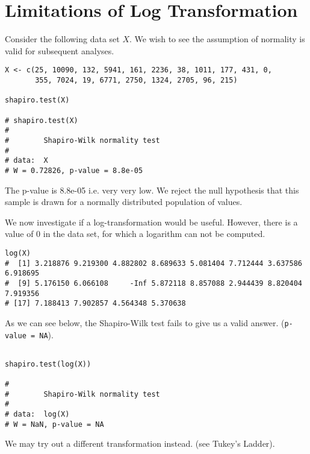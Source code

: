 
\section*{Limitations of Log Transformation}
Consider the following data set $X$. We wish to see the assumption of normality is valid for subsequent analyses.
\begin{framed}
\begin{verbatim}
X <- c(25, 10090, 132, 5941, 161, 2236, 38, 1011, 177, 431, 0, 
       355, 7024, 19, 6771, 2750, 1324, 2705, 96, 215)    

shapiro.test(X)

# shapiro.test(X)
#
#        Shapiro-Wilk normality test
#
# data:  X
# W = 0.72826, p-value = 8.8e-05
\end{verbatim}
\end{framed}
\noindent The p-value is 8.8e-05 i.e. very very low. We reject the null hypothesis that this sample is drawn for a normally distributed population of values.

\noindent We now investigate if a log-transformation would be useful. However, there is a value of 0 in the data set, for which a logarithm can not be computed.

\begin{framed}
\begin{verbatim}
log(X)
#  [1] 3.218876 9.219300 4.882802 8.689633 5.081404 7.712444 3.637586 6.918695
#  [9] 5.176150 6.066108     -Inf 5.872118 8.857088 2.944439 8.820404 7.919356
# [17] 7.188413 7.902857 4.564348 5.370638

\end{verbatim}
\end{framed}

\noindent As we can see below, the Shapiro-Wilk test fails to give us a valid answer. (\texttt{p-value = NA}).
\begin{framed}
\begin{verbatim}

shapiro.test(log(X))

#
#        Shapiro-Wilk normality test
#
# data:  log(X)
# W = NaN, p-value = NA
\end{verbatim}
\end{framed}
We may try out a different transformation instead. (see Tukey's Ladder).
